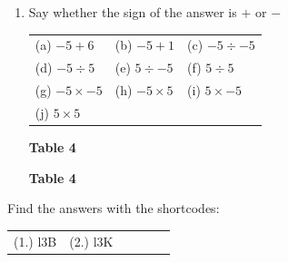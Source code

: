 \begin{enumerate}[noitemsep, label=\textbf{\arabic*}. ]
\begin{table}
    \begin{caption}{\small\bfseries Table 3}\end{caption}
\end{table}
    \par
          \label{m38346*uid34}\item Say whether the sign of the answer is $+$ or $-$
          \begin{table}
        \begin{center}
      \label{m38346*id175740}
    \noindent
      \tablelasttail{}
      \begin{xtabular}[t]{|l|l|l|}\hline
        (a) $-5+6$ &
        (b) $-5+1$ &
        (c) $-5÷-5$%
     \tabularnewline{}
        (d) $-5÷5$ &
        (e) $5÷-5$ &
        (f) $5÷5$%
     \tabularnewline{}
        (g) $-5\ensuremath{\times}-5$ &
        (h) $-5\ensuremath{\times}5$ &
        (i) $5\ensuremath{\times}-5$%
     \tabularnewline{}
        (j) $5\ensuremath{\times}5$ &
         &
     \tabularnewline{}
    \end{xtabular}
      \end{center}
    \begin{center}{\small\bfseries Table 4}\end{center}
    \begin{caption}{\small\bfseries Table 4}\end{caption}
\end{table}
    \par
        \end{enumerate}
\par {} Find the answers with the shortcodes:
 \par \begin{tabular}[h]{cccccc}
 (1.) l3B  &  (2.) l3K  & \end{tabular}
